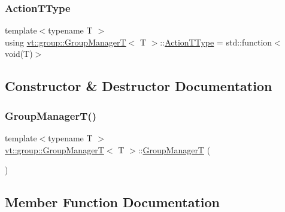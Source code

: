 \subsubsection{\texorpdfstring{Action\+T\+Type}{ActionTType}}
{\footnotesize\ttfamily template$<$typename T $>$ \\
using \hyperlink{structvt_1_1group_1_1_group_manager_t}{vt\+::group\+::\+Group\+ManagerT}$<$ T $>$\+::\hyperlink{structvt_1_1group_1_1_group_manager_t_acb20922687d3165d97de391fdbaf02ca}{Action\+T\+Type} =  std\+::function$<$void(T)$>$}



\subsection{Constructor \& Destructor Documentation}
\mbox{\label{structvt_1_1group_1_1_group_manager_t_a751380e18149d43fefffd79d22d96ebc}} 
\subsubsection{\texorpdfstring{Group\+Manager\+T()}{GroupManagerT()}}
{\footnotesize\ttfamily template$<$typename T $>$ \\
\hyperlink{structvt_1_1group_1_1_group_manager_t}{vt\+::group\+::\+Group\+ManagerT}$<$ T $>$\+::\hyperlink{structvt_1_1group_1_1_group_manager_t}{Group\+ManagerT} (\begin{DoxyParamCaption}{ }\end{DoxyParamCaption})\hspace{0.3cm}{\ttfamily [default]}}



\subsection{Member Function Documentation}
\mbox{\label{structvt_1_1group_1_1_group_manager_t_ad149f3bfcb76761f22283a1bf6b147d0}} 
